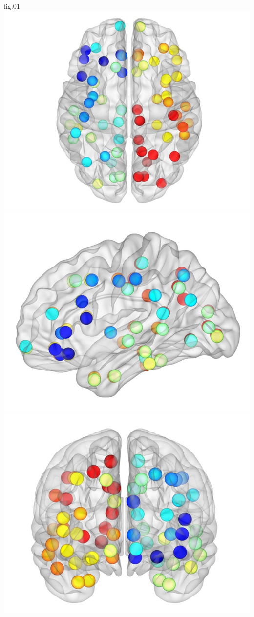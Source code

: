 \documentclass[justified]{tufte-handout}
\begin{document}
	{fig:01}
	{
	\includegraphics{fig01_01.jpg}
	\includegraphics{fig01_02.jpg}
	\includegraphics{fig01_03.jpg}
	}
\end{document}
